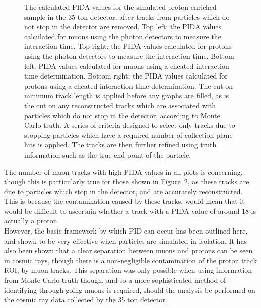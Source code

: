 \begin{figure}
\begin{subfigure}{0.48\textwidth}
        \label{fig:CRY_PIDACheat_Muon_Cheat}
  \end{subfigure}
  \caption[The calculated PIDA values for the simulated proton enriched sample in the 35 ton detector, after tracks from particles which do not stop in the detector are removed]
          {The calculated PIDA values for the simulated proton enriched sample in the 35 ton detector, after tracks from particles which do not stop in the detector are removed. Top left: the PIDA values calculated for muons using the photon detectors to measure the interaction time. Top right: the PIDA values calculated for protons using the photon detectors to measure the interaction time. Bottom left: PIDA values calculated for muons using a cheated interaction time determination. Bottom right: the PIDA values calculated for protons using a cheated interaction time determination. The cut on minimum track length is applied before any graphs are filled, as is the cut on any reconstructed tracks which are associated with particles which do not stop in the detector, according to Monte Carlo truth. A series of criteria designed to select only tracks due to stopping particles which have a required number of collection plane hits is applied. The tracks are then further refined using truth information such as the true end point of the particle.}
  \label{fig:CRY_PIDACheat}
\end{figure}

The number of muon tracks with high PIDA values in all plots is concerning, though this is particularly true for those shown in Figure~\ref{fig:CRY_PIDACheat}, as these tracks are due to particles which stop in the detector, and are accurately reconstructed. This is because the contamination caused by these tracks, would mean that it would be difficult to ascertain whether a track with a PIDA value of around 18 is actually a proton. \\

However, the basic framework by which PID can occur has been outlined here, and shown to be very effective when particles are simulated in isolation. It has also been shown that a clear separation between muons and protons can be seen in cosmic rays, though there is a non-negligible contamination of the proton track ROI, by muon tracks. This separation was only possible when using information from Monte Carlo truth though, and so a more sophisticated method of identifying through-going muons is required, should the analysis be performed on the cosmic ray data collected by the 35 ton detector. \\
